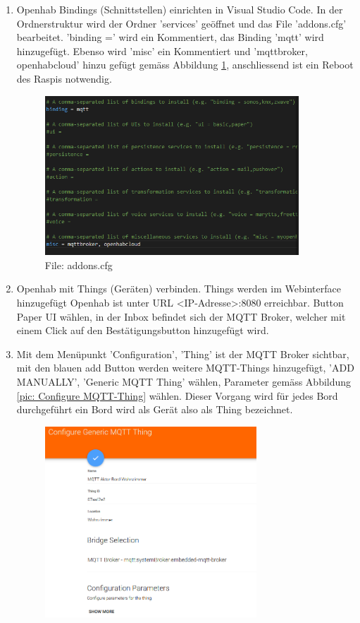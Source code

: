 \begin{enumerate}
	\item Openhab Bindings (Schnittstellen) einrichten in Visual Studio Code. In der Ordnerstruktur wird der Ordner 'services' geöffnet und das File 'addons.cfg' bearbeitet. 'binding =' wird ein Kommentiert, das Binding 'mqtt' wird hinzugefügt. Ebenso wird 'misc' ein Kommentiert und 'mqttbroker, openhabcloud' hinzu gefügt gemäss Abbildung \ref{pic: addons.cfg}, anschliessend ist ein Reboot des Raspis notwendig.  
	   \begin{figure}[H]
		\centering
		\includegraphics[width=0.9\textwidth]{graphics/addpnscfg.PNG}
		\caption{File: addons.cfg} 	
		\label{pic: addons.cfg}
	\end{figure} 
\item Openhab mit Things (Geräten) verbinden. Things werden im Webinterface hinzugefügt Openhab ist unter URL <IP-Adresse>:8080 erreichbar. Button Paper UI wählen, in der Inbox befindet sich der MQTT Broker, welcher mit einem Click auf den Bestätigungsbutton hinzugefügt wird. 
\item Mit dem Menüpunkt 'Configuration', 'Thing' ist der MQTT Broker sichtbar, mit den blauen add Button werden weitere MQTT-Things hinzugefügt, 'ADD MANUALLY', 'Generic MQTT Thing' wählen, Parameter gemäss Abbildung \ref{pic: Configure MQTT-Thing}  wählen. Dieser Vorgang wird für jedes Bord durchgeführt ein Bord wird als Gerät also als Thing bezeichnet.
	   \begin{figure}[H]
	\centering
	\includegraphics[width=0.75\textwidth]{graphics/MQTT-Thing.PNG}

\end{figure}
\end{enumerate}
